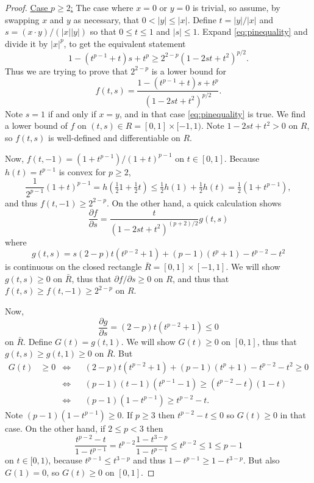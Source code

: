 \documentclass[final,leqno,onefignum,onetabnum]{siamltex1213bueler}
\begin{document}
\begin{proof}  \underline{Case $p \ge 2$:}  The case where $x=0$ or $y=0$ is trivial, so assume, by swapping $x$ and $y$ as necessary, that $0 < |y| \le |x|$.  Define $t=|y|/|x|$ and $s = (x\cdot y)/(|x||y|)$ so that $0\le t \le 1$ and $|s|\le 1$.  Expand \eqref{eq:pinequality} and divide it by $|x|^p$, to get the equivalent statement
    $$1 - (t^{p-1}+t) s + t^p \ge 2^{2-p} \left(1 - 2 s t + t^2\right)^{p/2}.$$
Thus we are trying to prove that $2^{2-p}$ is a lower bound for
	$$f(t,s) = \frac{1 - (t^{p-1}+t) s + t^p}{\left(1 - 2 s t + t^2\right)^{p/2}}.$$
Note $s=1$ if and only if $x=y$, and in that case \eqref{eq:pinequality} is true.  We find a lower bound of $f$ on $(t,s) \in R=[0,1]\times[-1,1)$.  Note $1-2st+t^2 > 0$ on $ R$, so $f(t,s)$ is well-defined and differentiable on $R$.

Now, $f(t,-1) = \left(1 + t^{p-1}\right) / \left(1 + t\right)^{p-1}$ on $t\in[0,1]$.  Because $h(t)=t^{p-1}$ is convex for $p \ge 2$,
    $$\frac{1}{2^{p-1}} (1+t)^{p-1} = h(\tfrac{1}{2} 1 + \tfrac{1}{2} t) \le \tfrac{1}{2} h(1) + \tfrac{1}{2} h(t) = \tfrac{1}{2} (1 + t^{p-1}),$$
and thus $f(t,-1) \ge 2^{2-p}$.  On the other hand, a quick calculation shows
    $$\frac{\partial f}{\partial s} = \frac{t}{\left(1 - 2 s t + t^2\right)^{(p+2)/2}} g(t,s)$$
where
    $$g(t,s) = s(2-p) t (t^{p-2} + 1) + (p-1) (t^p+1) - t^{p-2} - t^2$$
is continuous on the closed rectangle $\bar R = [0,1]\times[-1,1]$.  We will show $g(t,s)\ge 0$ on $\bar R$, thus that $\partial f/\partial s \ge 0$ on $R$, and thus that $f(t,s)\ge f(t,-1) \ge  2^{2-p}$ on $R$.

Now,
    $$\frac{\partial g}{\partial s} = (2-p) t (t^{p-2} + 1) \le 0$$
on $\bar R$.  Define $G(t) = g(t,1)$.  We will show $G(t)\ge 0$ on $[0,1]$, thus that $g(t,s)\ge g(t,1)\ge 0$ on $\bar R$.  But
\begin{align*}
G(t) &\ge 0 &\iff && (2-p) t (t^{p-2} + 1) + (p-1) (t^p+1) - t^{p-2} - t^2 \ge 0 \\
          & &\iff && (p-1) (t-1) (t^{p-1}-1) \ge (t^{p-2} - t) (1 - t)  \\
          & &\iff && (p-1) (1 - t^{p-1}) \ge t^{p-2} - t.
\end{align*}
Note $(p-1) (1 - t^{p-1}) \ge 0$.  If $p\ge 3$ then $t^{p-2} - t \le 0$ so $G(t)\ge 0$ in that case.  On the other hand, if $2\le p < 3$ then
	$$\frac{t^{p-2} - t}{1 - t^{p-1}} = t^{p-2} \frac{1 - t^{3-p}}{1 - t^{p-1}} \le t^{p-2} \le 1 \le p-1$$
on $t\in[0,1)$, because $t^{p-1}\le t^{3-p}$ and thus $1 - t^{p-1} \ge 1 - t^{3-p}$.  But also $G(1)=0$, so $G(t)\ge 0$ on $[0,1]$.


\end{proof}
\end{document}
